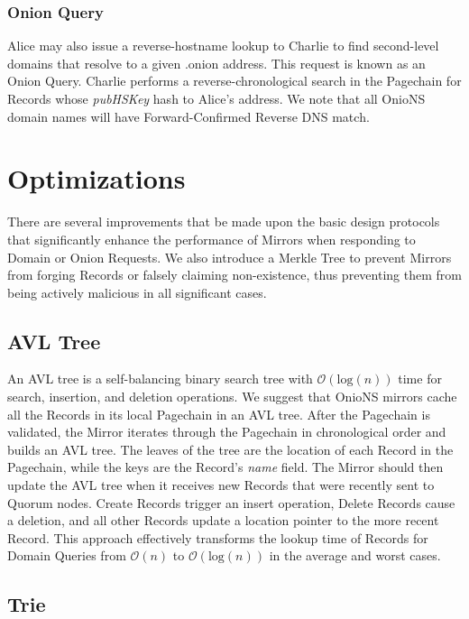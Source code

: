 \subsubsection{Onion Query}

Alice may also issue a reverse-hostname lookup to Charlie to find second-level domains that resolve to a given .onion address. This request is known as an Onion Query. Charlie performs a reverse-chronological search in the Pagechain for Records whose \emph{pubHSKey} hash to Alice's address. We note that all OnioNS domain names will have Forward-Confirmed Reverse DNS match.

\section{Optimizations}
\label{sec:optimizations}

There are several improvements that be made upon the basic design protocols that significantly enhance the performance of Mirrors when responding to Domain or Onion Requests. We also introduce a Merkle Tree to prevent Mirrors from forging Records or falsely claiming non-existence, thus preventing them from being actively malicious in all significant cases.

\subsection{AVL Tree}

An AVL tree is a self-balancing binary search tree with $ \mathcal{O}(\mathrm{log}(n)) $ time for search, insertion, and deletion operations. We suggest that OnioNS mirrors cache all the Records in its local Pagechain in an AVL tree. After the Pagechain is validated, the Mirror iterates through the Pagechain in chronological order and builds an AVL tree. The leaves of the tree are the location of each Record in the Pagechain, while the keys are the Record's \emph{name} field. The Mirror should then update the AVL tree when it receives new Records that were recently sent to Quorum nodes. Create Records trigger an insert operation, Delete Records cause a deletion, and all other Records update a location pointer to the more recent Record. This approach effectively transforms the lookup time of Records for Domain Queries from $ \mathcal{O}(n) $ to $ \mathcal{O}(\mathrm{log}(n)) $ in the average and worst cases.

\newpage

\subsection{Trie}


